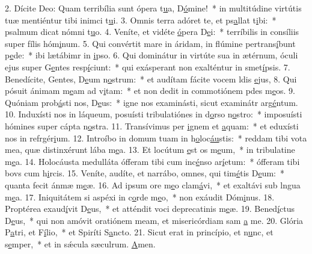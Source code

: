 2. Dícite Deo: Quam terribília sunt ópera t\uline{u}a, D\uline{ó}mine!~* in multitúdine virtútis tuæ mentiéntur tibi inimci t\uline{u}i.
3. Omnis terra adóret te, et ps\uline{a}llat t\uline{i}bi:~* psalmum dicat nómni t\uline{u}o.
4. Veníte, et vidéte \uline{ó}pera D\uline{e}i:~* terríbilis in consíliis super fílis hóm\uline{i}num.
5. Qui convértit mare in áridam, in flúmine pertrans\uline{í}bunt p\uline{e}de:~* ibi lætábimr in \uline{i}pso.
6. Qui dominátur in virtúte sua in ætérnum, óculi ejus super G\uline{e}ntes resp\uline{í}ciunt:~* qui exásperant non exalténtur in smet\uline{í}psis.
7. Benedícite, Gentes, D\uline{e}um n\uline{o}strum:~* et audítam fácite vocem ldis \uline{e}jus,
8. Qui pósuit ánimam m\uline{e}am ad v\uline{i}tam:~* et non dedit in commotiónem pdes m\uline{e}os.
9. Quóniam prob\uline{á}sti nos, D\uline{e}us:~* igne nos examinásti, sicut examinátr arg\uline{é}ntum.
10. Induxísti nos in láqueum, posuísti tribulatiónes in d\uline{o}rso n\uline{o}stro:~* imposuísti hómines super cápta n\uline{o}stra.
11. Transívimus per \uline{i}gnem et \uline{a}quam:~* et eduxísti nos in refrgér\uline{i}um.
12. Introíbo in domum tuam in h\uline{o}loc\uline{áu}stis:~* reddam tibi vota mea, quæ distinxérunt lába m\uline{e}a.
13. Et locútum \uline{e}st os m\uline{e}um,~* in tribulatine m\uline{e}a.
14. Holocáusta medulláta ófferam tibi cum inc\uline{é}nso ar\uline{í}etum:~* ófferam tibi bovs cum h\uline{i}rcis.
15. Veníte, audíte, et narrábo, omnes, qui tim\uline{é}tis D\uline{e}um:~* quanta fecit ánmæ m\uline{e}æ.
16. Ad ipsum ore m\uline{e}o clam\uline{á}vi,~* et exaltávi sub lngua m\uline{e}a.
17. Iniquitátem si aspéxi in c\uline{o}rde m\uline{e}o,~* non exáudit Dóm\uline{i}nus.
18. Proptérea exaud\uline{í}vit D\uline{e}us,~* et atténdit voci deprecatinis m\uline{e}æ.
19. Bened\uline{í}ctus D\uline{e}us,~* qui non amóvit oratiónem meam, et misericórdiam sam \uline{a} me.
20. Glória P\uline{a}tri, et F\uline{í}lio,~* et Spiríti S\uline{a}ncto.
21. Sicut erat in princípio, et n\uline{u}nc, et s\uline{e}mper,~* et in sǽcula sæculrum. \uline{A}men.
